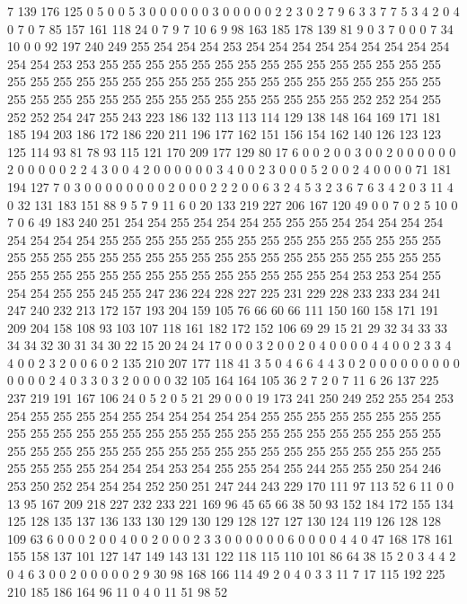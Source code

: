 7 139 176 125 0 5 0 0 5 3 0 0 0 0 0 0 3 0 0 0
0 0 2 2 3 0 2 7 9 6 3 3 7 7 5 3 4 2 0 4
0 7 0 7 85 157 161 118 24 0 7 9 7 10 6 9 98 163 185 178
139 81 9 0 3 7 0 0 0 7 34 10 0 0 92 197 240 249 255 254
254 254 253 254 254 254 254 254 254 254 254 254 254 254 253 253 255 255 255 255
255 255 255 255 255 255 255 255 255 255 255 255 255 255 255 255 255 255 255 255
255 255 255 255 255 255 255 255 255 255 255 255 255 255 255 255 255 255 255 255
255 255 255 255 255 252 252 254 255 252 252 254 247 255 243 223 186 132 113 113
114 129 138 148 164 169 171 181 185 194 203 186 172 186 220 211 196 177 162 151
156 154 162 140 126 123 123 125 114 93 81 78 93 115 121 170 209 177 129 80
17 6 0 0 2 0 0 3 0 0 2 0 0 0 0 0 0 2 0 0
0 0 0 2 2 4 3 0 0 4 2 0 0 0 0 0 0 3 4 0
0 2 3 0 0 0 5 2 0 0 2 4 0 0 0 0 71 181 194 127
7 0 3 0 0 0 0 0 0 0 0 2 0 0 0 2 2 2 0 0
6 3 2 4 5 3 2 3 6 7 6 3 4 2 0 3 11 4 0 32
131 183 151 88 9 5 7 9 11 6 0 20 133 219 227 206 167 120 49 0
0 7 0 2 5 10 0 7 0 6 49 183 240 251 254 254 255 254 254 254
255 255 255 254 254 254 254 254 254 254 254 254 255 255 255 255 255 255 255 255
255 255 255 255 255 255 255 255 255 255 255 255 255 255 255 255 255 255 255 255
255 255 255 255 255 255 255 255 255 255 255 255 255 255 255 255 255 255 255 255
254 253 253 254 255 254 254 255 255 245 255 247 236 224 228 227 225 231 229 228
233 233 234 241 247 240 232 213 172 157 193 204 159 105 76 66 60 66 111 150
160 158 171 191 209 204 158 108 93 103 107 118 161 182 172 152 106 69 29 15
21 29 32 34 33 33 34 34 32 30 31 34 30 22 15 20 24 24 17 0
0 0 3 2 0 0 2 0 4 0 0 0 0 4 4 0 0 2 3 3
4 4 0 0 2 3 2 0 0 6 0 2 135 210 207 177 118 41 3 5
0 4 6 6 4 4 3 0 2 0 0 0 0 0 0 0 0 0 0 0
0 0 2 4 0 3 3 0 3 2 0 0 0 0 32 105 164 164 105 36
2 7 2 0 7 11 6 26 137 225 237 219 191 167 106 24 0 5 2 0
5 21 29 0 0 0 19 173 241 250 249 252 255 254 253 254 255 255 255 254
255 254 254 254 254 254 255 255 255 255 255 255 255 255 255 255 255 255 255 255
255 255 255 255 255 255 255 255 255 255 255 255 255 255 255 255 255 255 255 255
255 255 255 255 255 255 255 255 255 255 255 255 255 255 255 255 254 254 254 253
254 255 255 254 255 244 255 255 250 254 246 253 250 252 254 254 254 252 250 251
247 244 243 229 170 111 97 113 52 6 11 0 0 13 95 167 209 218 227 232
233 221 169 96 45 65 66 38 50 93 152 184 172 155 134 125 128 135 137 136
133 130 129 130 129 128 127 127 130 124 119 126 128 128 109 63 6 0 0 0
2 0 0 4 0 0 2 0 0 0 2 3 3 0 0 0 0 0 0 6
0 0 0 0 4 4 0 47 168 178 161 155 158 137 101 127 147 149 143 131
122 118 115 110 101 86 64 38 15 2 0 3 4 4 2 0 4 6 3 0
0 2 0 0 0 0 0 2 9 30 98 168 166 114 49 2 0 4 0 3
3 11 7 17 115 192 225 210 185 186 164 96 11 0 4 0 11 51 98 52

